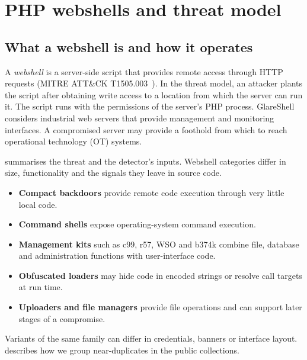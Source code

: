 \section{PHP webshells and threat model}\label{sec:background}

\subsection{What a webshell is and how it operates}
A \emph{webshell} is a server-side script that provides remote access through HTTP requests
(MITRE ATT\&CK T1505.003~\cite{mitre_t1505003}). In the threat model, an attacker plants the script after
obtaining write access to a location from which the server can run it. The script runs with the permissions
of the server's PHP process. GlareShell~\paperref{} considers industrial web servers that provide management
and monitoring interfaces. A compromised server may provide a foothold from which to reach operational
technology (OT) systems.

 summarises the threat and the detector's inputs. Webshell categories differ in size,
functionality and the signals they leave in source code.
\begin{itemize}
  \item \textbf{Compact backdoors} provide remote code execution through very little local code.
  \item \textbf{Command shells} expose operating-system command execution.
  \item \textbf{Management kits} such as c99, r57, WSO and b374k combine file, database and administration
        functions with user-interface code.
  \item \textbf{Obfuscated loaders} may hide code in encoded strings or resolve call targets at run time.
  \item \textbf{Uploaders and file managers} provide file operations and can support later stages of a compromise.
\end{itemize}
Variants of the same family can differ in credentials, banners or interface layout. 
describes how we group near-duplicates in the public collections.


